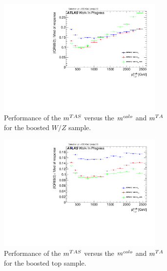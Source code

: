 \begin{figure}
    \centering
    \begin{subfigure}[b]{0.45\textwidth}
  \centering
      \includegraphics[width=0.9\textwidth]{jet_part/mtas/71graphcftr_h_JetRatio_mJ12CALOIQRoMWZ.pdf}
  \caption[$\mtas$ for boosted $W/Z$]{Performance of the $\mtas$ versus the $m^{calo}$ and $m^{TA}$ for the boosted $W/Z$ sample.}
  \label{fig:mtas2}
    \end{subfigure}
    \begin{subfigure}[b]{0.45\textwidth}
  \centering
      \includegraphics[width=0.9\textwidth]{jet_part/mtas/71graphcftr_h_JetRatio_mJ12CALOIQRoMTops.pdf}
  \caption[$\mtas$ for boosted tops]{Performance of the $\mtas$ versus the $m^{calo}$ and $m^{TA}$ for the boosted top sample.}
  \label{fig:mtas3}
    \end{subfigure}
    \begin{subfigure}[b]{0.45\textwidth}
  \centering

\end{subfigure}
\end{figure}
